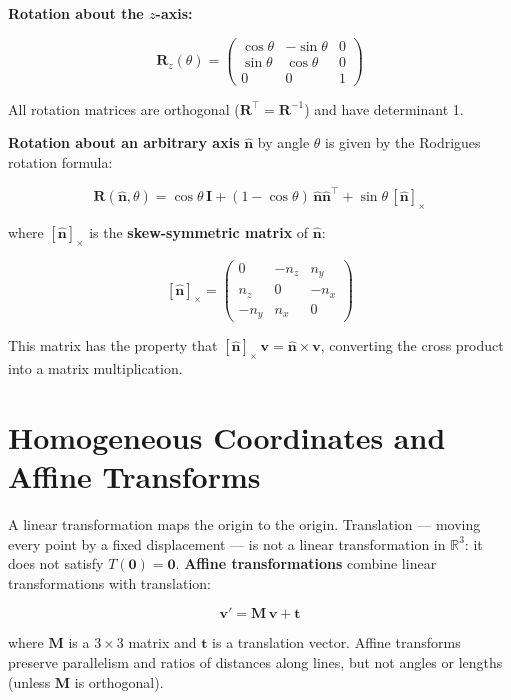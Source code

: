 \documentclass[
  11pt,
  letterpaper,
  DIV=11,
  numbers=noendperiod,
  twoside,
  open=right]{scrreprt}
\begin{document}
\textbf{Rotation about the \(z\)-axis:}

\[
\mathbf{R}_z(\theta) = \begin{pmatrix} \cos\theta & -\sin\theta & 0 \\ \sin\theta & \cos\theta & 0 \\ 0 & 0 & 1 \end{pmatrix}
\]

All rotation matrices are orthogonal
(\(\mathbf{R}^\top = \mathbf{R}^{-1}\)) and have determinant 1.

\textbf{Rotation about an arbitrary axis} \(\hat{\mathbf{n}}\) by angle
\(\theta\) is given by the Rodrigues rotation formula:

\[
\mathbf{R}(\hat{\mathbf{n}}, \theta) = \cos\theta \, \mathbf{I} + (1 - \cos\theta) \, \hat{\mathbf{n}} \hat{\mathbf{n}}^\top + \sin\theta \, [\hat{\mathbf{n}}]_\times
\]

where \([\hat{\mathbf{n}}]_\times\) is the \textbf{skew-symmetric
matrix} of \(\hat{\mathbf{n}}\):

\[
[\hat{\mathbf{n}}]_\times = \begin{pmatrix} 0 & -n_z & n_y \\ n_z & 0 & -n_x \\ -n_y & n_x & 0 \end{pmatrix}
\]

This matrix has the property that
\([\hat{\mathbf{n}}]_\times \, \mathbf{v} = \hat{\mathbf{n}} \times \mathbf{v}\),
converting the cross product into a matrix multiplication.

\section{Homogeneous Coordinates and Affine
Transforms}\label{homogeneous-coordinates-and-affine-transforms}

A linear transformation maps the origin to the origin. Translation ---
moving every point by a fixed displacement --- is not a linear
transformation in \(\mathbb{R}^3\): it does not satisfy
\(T(\mathbf{0}) = \mathbf{0}\). \textbf{Affine transformations} combine
linear transformations with translation:

\[
\mathbf{v}' = \mathbf{M} \, \mathbf{v} + \mathbf{t}
\]

where \(\mathbf{M}\) is a \(3 \times 3\) matrix and \(\mathbf{t}\) is a
translation vector. Affine transforms preserve parallelism and ratios of
distances along lines, but not angles or lengths (unless \(\mathbf{M}\)
is orthogonal).
\end{document}
